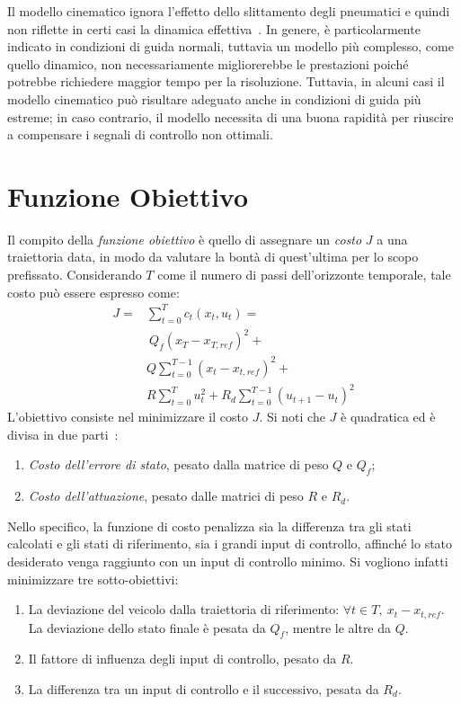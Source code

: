 Il modello cinematico ignora l'effetto dello slittamento degli pneumatici e quindi non riflette in 
certi casi la dinamica effettiva~\cite{jain2020bayesrace}. 
In genere, è particolarmente indicato in condizioni di guida normali, tuttavia un modello più 
complesso, come quello dinamico, non necessariamente migliorerebbe le prestazioni poiché potrebbe 
richiedere maggior tempo per la risoluzione. 
Tuttavia, in alcuni casi il modello cinematico può risultare adeguato anche in condizioni di guida 
più estreme; in caso contrario, il modello necessita di una buona rapidità per riuscire a compensare i segnali di controllo non ottimali.

\section{Funzione Obiettivo}
\label{subs:obj}
Il compito della \textit{funzione obiettivo} è quello di assegnare un \textit{costo} $J$
a una traiettoria data, in modo da valutare la bontà di quest'ultima per lo scopo prefissato. 
Considerando $T$ come il numero di passi dell'orizzonte temporale, tale costo può essere espresso come:
\[
\begin{aligned}
J = & \sum_{t=0}^{T}c_t(x_t, u_t) = \\ &
\ Q_{f}\left(x_{T}-x_{T, r e f}\right)^{2}+ \\ & Q \sum_{t=0}^{T-1}\left(x_{t}-x_{t, r e f}\right)^{2}+ \\ & R \sum_{t=0}^{T} u_{t}^{2}+R_{d} \sum_{t=0}^{T-1}\left(u_{t+1}-u_{t}\right)^{2}
\end{aligned}
\]
L'obiettivo consiste nel minimizzare il costo $J$. Si noti che $J$ è quadratica ed è divisa in due parti~\cite{f1tenthcoursel13}:
\begin{enumerate}
    \item \textit{Costo dell'errore di stato}, pesato dalla matrice di peso $Q$ e $Q_f$;
    \item \textit{Costo dell'attuazione}, pesato dalle matrici di peso $R$ e $R_d$. 
\end{enumerate}
Nello specifico, la funzione di costo penalizza sia la differenza tra gli stati calcolati e gli 
stati di riferimento, sia i grandi input di controllo, affinché lo stato desiderato venga 
raggiunto con un input di controllo minimo. Si vogliono infatti minimizzare tre sotto-obiettivi:
\begin{enumerate}
    \item La deviazione del veicolo dalla traiettoria di riferimento: $\forall t \in T, \ x_t-x_{t, r e f}$. 
    La deviazione dello stato finale è pesata da $Q_f$, mentre le altre da $Q$.
    \item Il fattore di influenza degli input di controllo,
    pesato da $R$.
    \item La differenza tra un input di controllo e il successivo, pesata da $R_d$.
\end{enumerate}
